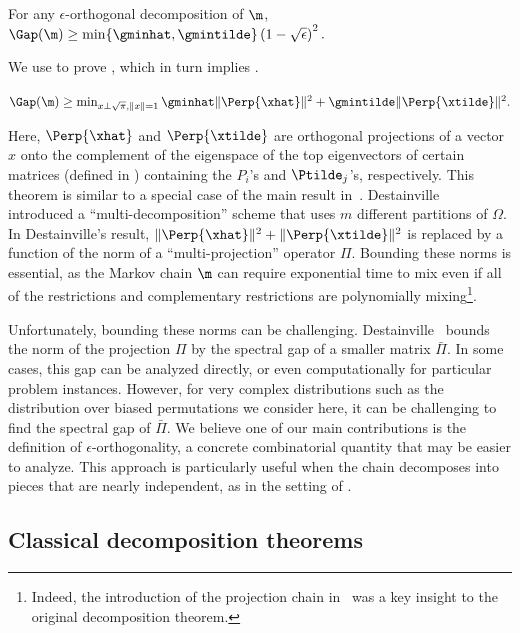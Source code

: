 \begin{theorem}\label{thm:indep}
For any $\epsilon$-orthogonal decomposition of $\m$, $\Gap(\m) 
\geq \min\{\gminhat, \gmintilde\}\left(1 -\sqrt{\epsilon}\right)^2.$
\end{theorem}

\noindent
We use  to prove ,
which in turn implies .

\begin{theorem}\label{thm:primaldual}
$\Gap(\m)\geq \min_{x\perp \sqrt{\pi}, \|x\|=1}  
\gminhat\|\Perp{\xhat}\|^2+\gmintilde\|\Perp{\xtilde}\|^2.$
\end{theorem}

Here, $\Perp{\xhat}$ and $\Perp{\xtilde}$ are orthogonal projections of 
a vector $x$ onto the complement of the eigenspace of the top 
eigenvectors of certain matrices (defined in ) 
containing the $P_i$'s and $\Ptilde_j$'s, respectively. This theorem is 
similar to a special case of the main result in~\cite{Dest03}. 
Destainville~\cite{Dest03} introduced a ``multi-decomposition'' scheme 
that uses $m$ different partitions of $\Omega$. In Destainville's 
result, $\|\Perp{\xhat}\|^2+\|\Perp{\xtilde}\|^2$ is replaced by a 
function of the norm of a ``multi-projection'' operator $\Pi$. Bounding 
these norms is essential, as the Markov chain $\m$ can require 
exponential time to mix even if all of the restrictions and 
complementary restrictions are polynomially mixing\footnote{Indeed, the 
introduction of the projection chain in~\cite{madr} was a key insight 
to the original decomposition theorem.}.

Unfortunately, bounding these norms can be challenging. 
Destainville~\cite{Dest03} bounds the norm of the projection $\Pi$ by 
the spectral gap of a smaller matrix $\bar{\Pi}$. In some cases, this 
gap can be analyzed directly, or even computationally for particular 
problem instances. However, for very complex distributions such as the 
distribution over biased permutations we consider here, it can be 
challenging to find the spectral gap of $\bar{\Pi}$. We believe one of 
our main contributions is the definition of $\epsilon$-orthogonality, a 
concrete combinatorial quantity that may be easier to analyze.  This 
approach is particularly useful when the chain decomposes into pieces 
that are nearly independent, as in the setting of 
.

\subsection{Classical decomposition theorems}\label{sec:classcomp}

